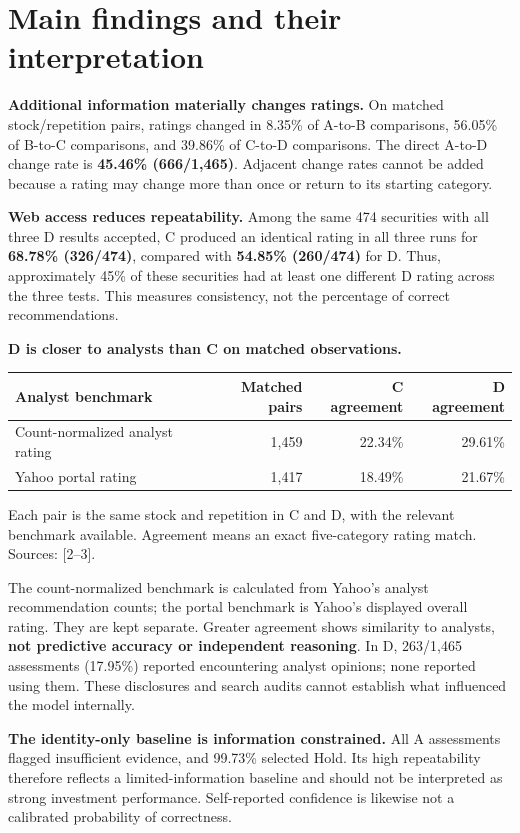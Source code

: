 \documentclass[10pt,letterpaper]{article}
\begin{document}
\newpage
\section{Main findings and their interpretation}
\textbf{Additional information materially changes ratings.} On matched stock/repetition pairs, ratings changed in 8.35\% of A-to-B comparisons, 56.05\% of B-to-C comparisons, and 39.86\% of C-to-D comparisons. The direct A-to-D change rate is \textbf{45.46\% (666/1,465)}. Adjacent change rates cannot be added because a rating may change more than once or return to its starting category.

\textbf{Web access reduces repeatability.} Among the same 474 securities with all three D results accepted, C produced an identical rating in all three runs for \textbf{68.78\% (326/474)}, compared with \textbf{54.85\% (260/474)} for D. Thus, approximately 45\% of these securities had at least one different D rating across the three tests. This measures consistency, not the percentage of correct recommendations.

\textbf{D is closer to analysts than C on matched observations.}\par
\begin{tabularx}{\linewidth}{@{}Yrrr@{}}
\toprule
{} Analyst benchmark & Matched pairs & C agreement & D agreement \\
\midrule
Count-normalized analyst rating & 1,459 & 22.34\% & 29.61\% \\
Yahoo portal rating & 1,417 & 18.49\% & 21.67\% \\
\bottomrule
\end{tabularx}
{\footnotesize\color{muted}Each pair is the same stock and repetition in C and D, with the relevant benchmark available. Agreement means an exact five-category rating match. Sources: [2--3].}

The count-normalized benchmark is calculated from Yahoo's analyst recommendation counts; the portal benchmark is Yahoo's displayed overall rating. They are kept separate. Greater agreement shows similarity to analysts, \textbf{not predictive accuracy or independent reasoning}. In D, 263/1,465 assessments (17.95\%) reported encountering analyst opinions; none reported using them. These disclosures and search audits cannot establish what influenced the model internally.

\textbf{The identity-only baseline is information constrained.} All A assessments flagged insufficient evidence, and 99.73\% selected Hold. Its high repeatability therefore reflects a limited-information baseline and should not be interpreted as strong investment performance. Self-reported confidence is likewise not a calibrated probability of correctness.
\end{document}
